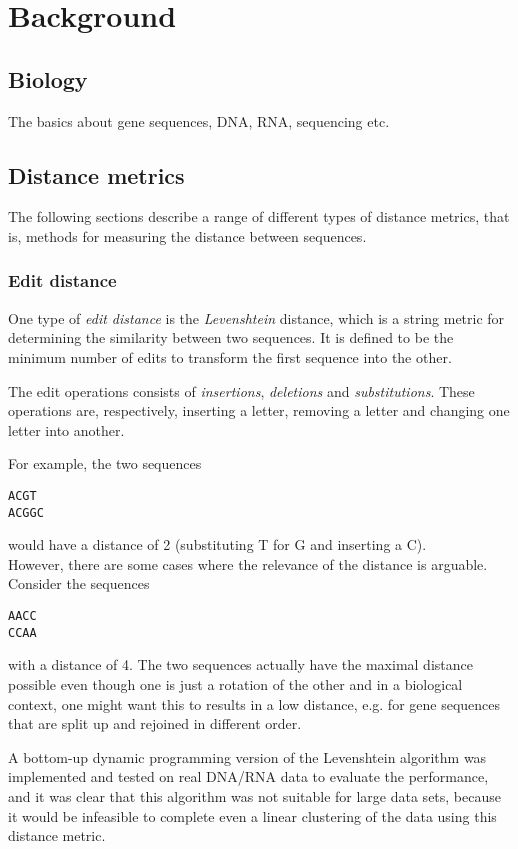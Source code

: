 \section{Background}

\subsection{Biology}
The basics about gene sequences, DNA, RNA, sequencing etc. %

\subsection{Distance metrics}
The following sections describe a range of different types of distance metrics,
that is, methods for measuring the distance between sequences.

\subsubsection{Edit distance}
One type of \emph{edit distance} is the \emph{Levenshtein} distance, which is a
string metric for determining the similarity between two sequences. It is
defined to be the minimum number of edits to transform the first sequence into
the other.~\cite[p.~52]{dong}

The edit operations consists of \emph{insertions}, \emph{deletions} and
\emph{substitutions}. These operations are, respectively, inserting a letter,
removing a letter and changing one letter into another.

For example, the two sequences
\begin{center}
\texttt{ACGT} \\
\texttt{ACGGC}
\end{center}
would have a distance of 2 (substituting T for G and inserting a C). \\
However, there are some cases where the relevance of the distance is arguable.
Consider the sequences
\begin{center}
\texttt{AACC} \\
\texttt{CCAA}
\end{center}
with a distance of 4. The two sequences actually have the maximal distance
possible even though one is just a rotation of the other and in a biological
context, one might want this to results in a low distance, e.g. for gene
sequences that are split up and rejoined in different order.

A bottom-up dynamic programming version of the Levenshtein algorithm was
implemented and tested on real DNA/RNA data to evaluate the performance, and it
was clear that this algorithm was not suitable for large data sets, because it
would be infeasible to complete even a linear clustering of the data using this
distance metric.

